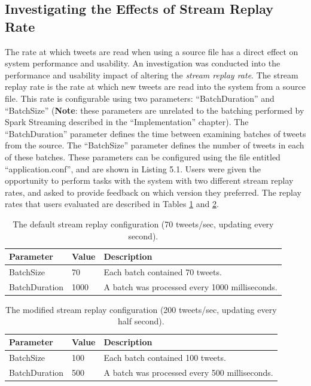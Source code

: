 \documentclass{l4proj}
\begin{document}
    \subsection{Investigating the Effects of Stream Replay Rate}
    The rate at which tweets are read when using a source file has a direct effect on system performance and usability. An investigation was conducted into the performance and usability impact of altering the \textit{stream replay rate}. The stream replay rate is the rate at which new tweets are read into the system from a source file. This rate is configurable using two parameters: ``BatchDuration'' and ``BatchSize'' (\textbf{Note}: these parameters are unrelated to the batching performed by Spark Streaming described in the ``Implementation'' chapter). The ``BatchDuration'' parameter defines the time between examining batches of tweets from the source. The ``BatchSize'' parameter defines the number of tweets in each of these batches. These parameters can be configured using the file entitled ``application.conf'', and are shown in Listing 5.1. Users were given the opportunity to perform tasks with the system with two different stream replay rates, and asked to provide feedback on which version they preferred. The replay rates that users evaluated are described in Tables \ref{table:replayrate1} and \ref{table:replayrate2}.
    
\begin{table}[H]
    \centering
    \begin{tabular}{| l | l | l |}
    \hline
    Parameter & Value & Description \\ \hline
    BatchSize & 70 & Each batch contained 70 tweets. \\ \hline
    BatchDuration & 1000 & A batch was processed every 1000 milliseconds. \\
    \hline
    \end{tabular}
    \caption{\label{table:replayrate1} The default stream replay configuration (70 tweets/sec, updating every second).}
\end{table}

\begin{table}[H]
    \centering
    \begin{tabular}{| l | l | l |}
    \hline
    Parameter & Value & Description \\ \hline
    BatchSize & 100 & Each batch contained 100 tweets. \\ \hline
    BatchDuration & 500 & A batch was processed every 500 milliseconds. \\
    \hline
    \end{tabular}
    \caption{\label{table:replayrate2} The modified stream replay configuration (200 tweets/sec, updating every half second).}
\end{table}     
    
\end{document}
